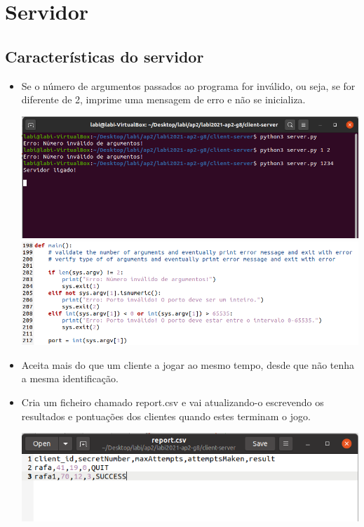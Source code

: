 \documentclass{report}
\begin{document}
\tableofcontents


\clearpage
{}

\chapter{Servidor}
\label{chap.servidor}
\section{Características do servidor}
\begin{itemize}
    \item Se o número de argumentos passados ao programa for inválido, ou seja, se for diferente de 2, imprime uma mensagem de erro e não se inicializa.
        \begin{center}
            \includegraphics[scale = 0.58]{Imagens/servidor_erro.png}
            \includegraphics[scale = 0.58]{Imagens/servidor_erro1.png}
        \end{center}
    \item Aceita mais do que um cliente a jogar ao mesmo tempo, desde que não tenha a mesma identificação.
    \item Cria um ficheiro chamado report.csv e vai atualizando-o escrevendo os resultados e pontuações dos clientes quando estes terminam o jogo.
        \begin{center}
            \includegraphics[scale = 0.7]{Imagens/report.png}

\end{center}
\end{itemize}
\end{document}
